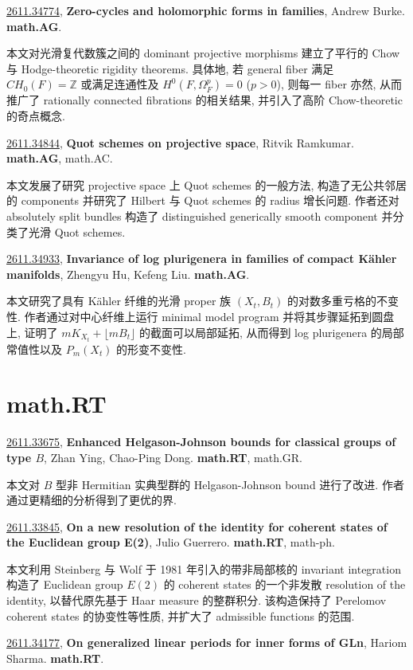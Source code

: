 \documentclass[9pt, a4paper]{article}
\theoremstyle{plain}
\theoremstyle{definition}
\theoremstyle{remark}
\newcommand{\arxivwithtarget}[3]{\hypertarget{#1}{}\href{https://arxiv.org/abs/#1}{#1}, \textbf{\textcolor{arxivblue}{#2}}, #3. }
\begin{document}
\arxivwithtarget{2611.34774}{Zero-cycles and holomorphic forms in families}{Andrew Burke}\textbf{math.AG}.

本文对光滑复代数簇之间的 dominant projective morphisms 建立了平行的 Chow 与 Hodge-theoretic rigidity theorems. 具体地, 若 general fiber 满足 $CH_0(F) = \mathbb{Z}$ 或满足连通性及 $H^0(F, \Omega_F^p) = 0$ ($p > 0$), 则每一 fiber 亦然, 从而推广了 rationally connected fibrations 的相关结果, 并引入了高阶 Chow-theoretic 的奇点概念.


\arxivwithtarget{2611.34844}{Quot schemes on projective space}{Ritvik Ramkumar}\textbf{math.AG}, math.AC.

本文发展了研究 projective space 上 Quot schemes 的一般方法, 构造了无公共邻居的 components 并研究了 Hilbert 与 Quot schemes 的 radius 增长问题. 作者还对 absolutely split bundles 构造了 distinguished generically smooth component 并分类了光滑 Quot schemes.


\arxivwithtarget{2611.34933}{Invariance of log plurigenera in families of compact Kähler manifolds}{Zhengyu Hu, Kefeng Liu}\textbf{math.AG}.

本文研究了具有 Kähler 纤维的光滑 proper 族 \((X_t,B_t)\) 的对数多重亏格的不变性. 作者通过对中心纤维上运行 minimal model program 并将其步骤延拓到圆盘上, 证明了 \(mK_{X_t}+\lfloor mB_t\rfloor\) 的截面可以局部延拓, 从而得到 log plurigenera 的局部常值性以及 \(P_m(X_t)\) 的形变不变性.


\section{math.RT}
\arxivwithtarget{2611.33675}{Enhanced Helgason-Johnson bounds for classical groups of type $B$}{Zhan Ying, Chao-Ping Dong}\textbf{math.RT}, math.GR.

本文对 $B$ 型非 Hermitian 实典型群的 Helgason-Johnson bound 进行了改进. 作者通过更精细的分析得到了更优的界.


\arxivwithtarget{2611.33845}{On a new resolution of the identity for coherent states of the Euclidean group E(2)}{Julio Guerrero}\textbf{math.RT}, math-ph.

本文利用 Steinberg 与 Wolf 于 1981 年引入的带非局部核的 invariant integration 构造了 Euclidean group $E(2)$ 的 coherent states 的一个非发散 resolution of the identity, 以替代原先基于 Haar measure 的整群积分. 该构造保持了 Perelomov coherent states 的协变性等性质, 并扩大了 admissible functions 的范围.


\arxivwithtarget{2611.34177}{On generalized linear periods for inner forms of GLn}{Hariom Sharma}\textbf{math.RT}.
\end{document}
